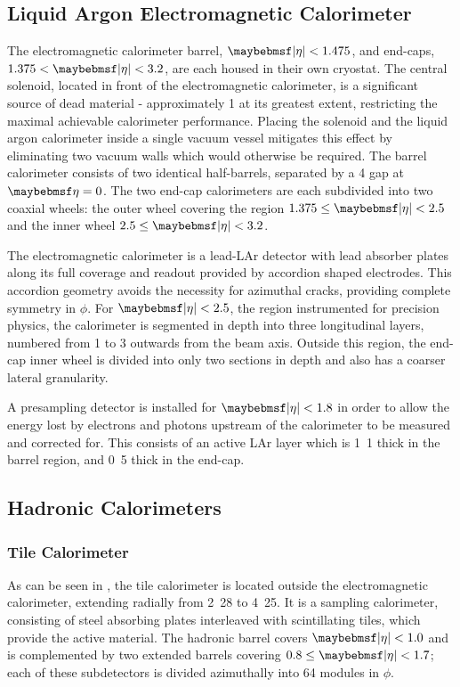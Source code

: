 \subsection{Liquid Argon Electromagnetic Calorimeter}
The electromagnetic calorimeter barrel, $\absEta < 1.475$, and end-caps, $1.375 < \absEta < 3.2$, are each housed in their own cryostat.
The central solenoid, located in front of the electromagnetic calorimeter, is a significant source of dead material - approximately \unit{1}{\lambda} at its greatest extent, restricting the maximal achievable calorimeter performance.
Placing the solenoid and the liquid argon calorimeter inside a single vacuum vessel mitigates this effect by eliminating two vacuum walls which would otherwise be required.
The barrel calorimeter consists of two identical half-barrels, separated by a \unit{4}{\milli\metre} gap at $\pseudorap = 0$.
The two end-cap calorimeters are each subdivided into two coaxial wheels: the outer wheel covering the region $1.375 \leq \absEta < 2.5$ and the inner wheel $2.5 \leq \absEta < 3.2$.

The electromagnetic calorimeter is a lead-LAr detector with lead absorber plates along its full coverage and readout provided by accordion shaped electrodes.
This accordion geometry avoids the necessity for azimuthal cracks, providing complete symmetry in $\phi$.
For $\absEta < 2.5$, the region instrumented for precision physics, the calorimeter is segmented in depth into three longitudinal layers, numbered from 1 to 3 outwards from the beam axis.
Outside this region, the end-cap inner wheel is divided into only two sections in depth and also has a coarser lateral granularity.

A presampling detector is installed for $\absEta < 1.8$ in order to allow the energy lost by electrons and photons upstream of the calorimeter to be measured and corrected for.
This consists of an active LAr layer which is \unit{1.1}{\centi\metre} thick in the barrel region, and \unit{0.5}{\centi\metre} thick in the end-cap.

\subsection{Hadronic Calorimeters}
\subsubsection{Tile Calorimeter}
As can be seen in , the tile
calorimeter is located outside the electromagnetic calorimeter, extending radially from
\unit{2.28}{\metre} to \unit{4.25}{\metre}. It is a sampling calorimeter,
consisting of steel absorbing plates interleaved with scintillating tiles, which provide the
active material. The hadronic barrel covers $\absEta < 1.0$ and is complemented
by two extended barrels covering $0.8 \leq \absEta < 1.7$; each of these
subdetectors is divided azimuthally into 64 modules in $\phi$.

